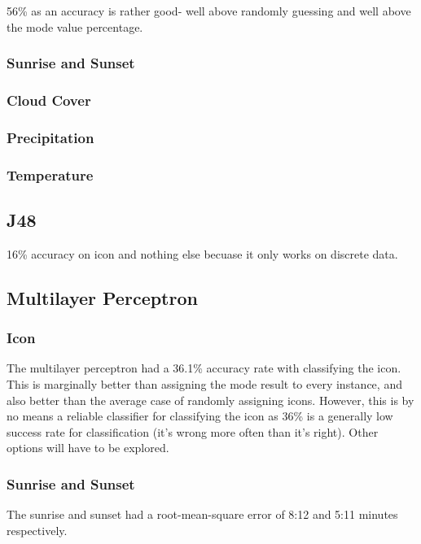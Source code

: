 \documentclass[a4paper,12pt,twoside]{report}
\begin{document}
56\% as an accuracy is rather good- well above randomly guessing and well above the mode value percentage. 

\subsubsection{Sunrise and Sunset}


\subsubsection{Cloud Cover}

\subsubsection{Precipitation}

\subsubsection{Temperature}

\subsection{J48}
16\% accuracy on icon and nothing else becuase it only works on discrete data.

\subsection{Multilayer Perceptron}

\subsubsection{Icon}
The multilayer perceptron had a 36.1\% accuracy rate with classifying the icon. This is marginally better than assigning the mode result to every instance, and also better than the average case of randomly assigning icons. However, this is by no means a reliable classifier for classifying the icon as 36\% is a generally low success rate for classification (it's wrong more often than it's right). Other options will have to be explored.

\subsubsection{Sunrise and Sunset}
The sunrise and sunset had a root-mean-square error of 8:12 and 5:11 minutes respectively.
\end{document}
